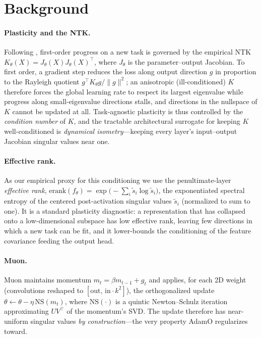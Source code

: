 \documentclass[letterpaper,twocolumn,10pt]{article}
\begin{document}
\section{Background}
\paragraph{Plasticity and the NTK.} Following \citet{adamo2026}, first-order progress on a new task is governed by the empirical NTK $K_\theta(X)=J_\theta(X)J_\theta(X)^\top$, where $J_\theta$ is the parameter--output Jacobian. To first order, a gradient step reduces the loss along output direction $g$ in proportion to the Rayleigh quotient $g^\top K_\theta g/\|g\|^2$; an anisotropic (ill-conditioned) $K$ therefore forces the global learning rate to respect its largest eigenvalue while progress along small-eigenvalue directions stalls, and directions in the nullspace of $K$ cannot be updated at all. Task-agnostic plasticity is thus controlled by the \emph{condition number} of $K$, and the tractable architectural surrogate for keeping $K$ well-conditioned is \emph{dynamical isometry}---keeping every layer's input--output Jacobian singular values near one.

\paragraph{Effective rank.} As our empirical proxy for this conditioning we use the penultimate-layer \emph{effective rank}, $\mathrm{erank}(f_\theta)=\exp\!\big(-\sum_i \tilde s_i\log \tilde s_i\big)$, the exponentiated spectral entropy of the centered post-activation singular values $\tilde s_i$ (normalized to sum to one). It is a standard plasticity diagnostic: a representation that has collapsed onto a low-dimensional subspace has low effective rank, leaving few directions in which a new task can be fit, and it lower-bounds the conditioning of the feature covariance feeding the output head.

\paragraph{Muon.} Muon maintains momentum $m_t=\beta m_{t-1}+g_t$ and applies, for each 2D weight (convolutions reshaped to $[\text{out},\,\text{in}\cdot k^2]$), the orthogonalized update $\theta\!\leftarrow\!\theta-\eta\,\mathrm{NS}(m_t)$, where $\mathrm{NS}(\cdot)$ is a quintic Newton--Schulz iteration approximating $UV^\top$ of the momentum's SVD. The update therefore has near-uniform singular values \emph{by construction}---the very property AdamO regularizes toward.
\end{document}
